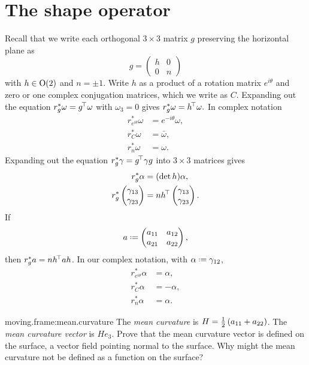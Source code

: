 \section{The shape operator}
Recall that we write each orthogonal \(3\times 3\) matrix \(g\) preserving the horizontal plane as
\[
 g=\begin{pmatrix}
    h & 0 \\
    0 & n
   \end{pmatrix}
\]
with \(h \in \textrm{O}\!\left(2\right)\) and \(n=\pm 1\).
Write \(h\) as a product of a rotation matrix \(e^{i\theta}\) and zero or one complex conjugation matrices, which we write as \(C\).
Expanding out the equation \(r_g^* \omega=g^{\!\top} \omega\) with \(\omega_3=0\) gives
\(
r_g^*\omega=h^{\!\top} \omega.
\)
In complex notation
\begin{align*}
r_{e^{i\theta}}^* \omega &= e^{-i\theta}\omega,\\
r_{C}^*\omega &= \bar\omega,\\
r_n^*\omega &= \omega.
\end{align*}
Expanding out the equation \(r_g^* \gamma=g^{\!\top} \gamma g\) into \(3 \times 3\) matrices gives
\begin{align*}
r_g^* \alpha &= (\det h)\alpha, \\
r_g^* 
\begin{pmatrix}
\gamma_{13} \\
\gamma_{23}
\end{pmatrix}
&=
n
h^{\!\top}
\begin{pmatrix}
\gamma_{13} \\
\gamma_{23}
\end{pmatrix}.
\end{align*}
If
\[
a\defeq
\begin{pmatrix}
a_{11} & a_{12} \\
a_{21} & a_{22}
\end{pmatrix},
\]
then \(r_g^*a = nh^{\!\top}ah\).
In our complex notation, with \(\alpha\defeq\gamma_{12}\),
\begin{align*}
r_{e^{i\theta}}^*\alpha &= \alpha,\\
r_C^*\alpha &= -\alpha,\\
r_n^*\alpha &= \alpha.
\end{align*}
\begin{problem}{moving.frame:mean.curvature}
The \emph{mean curvature} is \(H=\frac{1}{2}\left(a_{11}+a_{22}\right)\).
The \emph{mean curvature vector} is \(He_3\).
Prove that the mean curvature vector is defined on the surface, a vector field pointing normal to the surface.
Why might the mean curvature not be defined as a function on the surface?
\end{problem}
